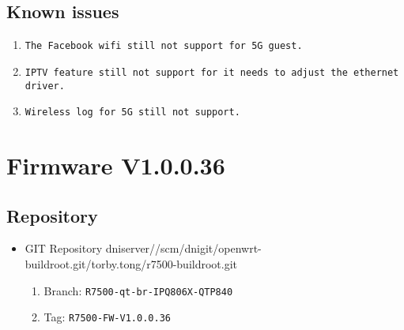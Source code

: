 \documentclass[12pt]{report}
\newcommand{\tlabel}[1]{
  \label{#1}%
  }
\begin{document}
\subsection{Known issues}
            \begin{enumerate}
		\item \texttt{The Facebook wifi still not support for 5G guest.}
		\item \texttt{IPTV feature still not support for it needs to adjust the ethernet driver.}
		\item \texttt{Wireless log for 5G still not support.}
            \end{enumerate}

\section{Firmware V1.0.0.36}

\tlabel{sec:1-0-1}
\subsection{Repository}
\begin{itemize}
	\item GIT Repository dniserver//scm/dnigit/openwrt-buildroot.git/torby.tong/r7500-buildroot.git
	\begin{enumerate}
		\item Branch: \texttt{R7500-qt-br-IPQ806X-QTP840}
                \item Tag: \texttt{R7500-FW-V1.0.0.36}
	\end{enumerate}
\end{itemize}
\end{document}
